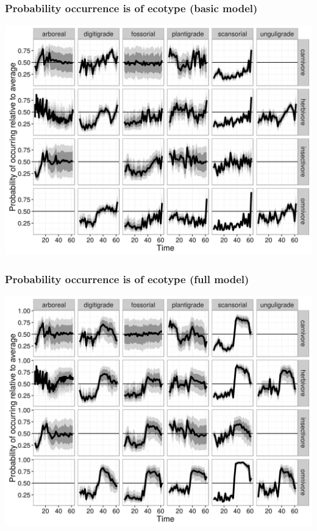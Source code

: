 \documentclass{beamer}
\begin{document}
\begin{frame}
  \frametitle{Probability occurrence is of ecotype (basic model)}

  \begin{center}
    \includegraphics[height=0.8\textheight,width=\textwidth,keepaspectratio=true]{figure/cept_occur_prob_basic}
  \end{center}
\end{frame}


\begin{frame}
  \frametitle{Probability occurrence is of ecotype (full model)}

  \begin{center}
    \includegraphics[height=0.8\textheight,width=\textwidth,keepaspectratio=true]{figure/cept_occur_prob_full}
  \end{center}
\end{frame}
\end{document}
